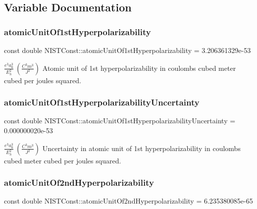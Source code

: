 \subsection{Variable Documentation}
\mbox{\label{group___atomic_unit_gaa43ceaed22f3b69aee64d117cae645fb}} 
\subsubsection{\texorpdfstring{atomic\+Unit\+Of1st\+Hyperpolarizability}{atomicUnitOf1stHyperpolarizability}}
{\footnotesize\ttfamily const double N\+I\+S\+T\+Const\+::atomic\+Unit\+Of1st\+Hyperpolarizability = 3.\+206361329e-\/53}

$\frac{e^3 a_0^3}{E_h^2} \ (\frac{C^3 m^3}{J^2})$ Atomic unit of 1st hyperpolarizability in coulombs cubed meter cubed per joules squared. \mbox{\label{group___atomic_unit_ga6763b09c4e925292e6a3a22b93a53abd}} 
\subsubsection{\texorpdfstring{atomic\+Unit\+Of1st\+Hyperpolarizability\+Uncertainty}{atomicUnitOf1stHyperpolarizabilityUncertainty}}
{\footnotesize\ttfamily const double N\+I\+S\+T\+Const\+::atomic\+Unit\+Of1st\+Hyperpolarizability\+Uncertainty = 0.\+000000020e-\/53}

$\frac{e^3 a_0^3}{E_h^2} \ (\frac{C^3 m^3}{J^2})$ Uncertainty in atomic unit of 1st hyperpolarizability in coulombs cubed meter cubed per joules squared. \mbox{\label{group___atomic_unit_ga55b22fa50aa069b98aa1bcb050206a8e}} 
\subsubsection{\texorpdfstring{atomic\+Unit\+Of2nd\+Hyperpolarizability}{atomicUnitOf2ndHyperpolarizability}}
{\footnotesize\ttfamily const double N\+I\+S\+T\+Const\+::atomic\+Unit\+Of2nd\+Hyperpolarizability = 6.\+235380085e-\/65}

